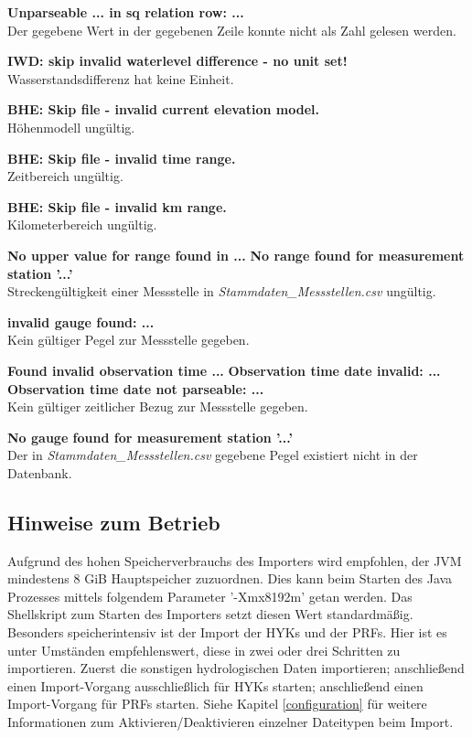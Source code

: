 \textbf{Unparseable ... in sq relation row: ...}
\\Der gegebene Wert in der gegebenen Zeile konnte nicht als Zahl gelesen werden.

\textbf{IWD: skip invalid waterlevel difference - no unit set!}
\\Wasserstandsdifferenz hat keine Einheit.

\textbf{BHE: Skip file - invalid current elevation model.}
\\Höhenmodell ungültig.

\textbf{BHE: Skip file - invalid time range.}
\\Zeitbereich ungültig.

\textbf{BHE: Skip file - invalid km range.}
\\Kilometerbereich ungültig.

\textbf{No upper value for range found in ...}
\textbf{No range found for measurement station '...'}
\\Streckengültigkeit einer Messstelle in \textit{Stammdaten\_Messstellen.csv} ungültig.

\textbf{invalid gauge found: ...}
\\Kein gültiger Pegel zur Messstelle gegeben.

\textbf{Found invalid observation time ...}
\textbf{Observation time date invalid: ...}
\textbf{Observation time date not parseable: ...}
\\Kein gültiger zeitlicher Bezug zur Messstelle gegeben.

\textbf{No gauge found for measurement station '...'}
\\Der in \textit{Stammdaten\_Messstellen.csv} gegebene Pegel existiert nicht in der Datenbank.

\subsection{Hinweise zum Betrieb}
Aufgrund des hohen Speicherverbrauchs des Importers wird empfohlen, der JVM
mindestens 8 GiB Hauptspeicher zuzuordnen. Dies kann beim Starten des Java
Prozesses mittels folgendem Parameter '-Xmx8192m' getan werden. Das
Shellskript zum Starten des Importers setzt diesen Wert standardmäßig.
Besonders speicherintensiv ist der Import der HYKs und der PRFs.
Hier ist es unter Umständen empfehlenswert, diese in zwei oder drei
Schritten zu importieren. Zuerst die sonstigen hydrologischen Daten importieren;
anschließend einen Import-Vorgang ausschließlich für HYKs starten; anschließend
einen Import-Vorgang für PRFs starten. Siehe Kapitel \ref{configuration} für
weitere Informationen zum Aktivieren/Deaktivieren einzelner Dateitypen beim
Import.


